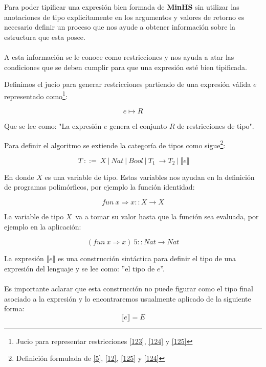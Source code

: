    Para poder tipificar una expresión bien formada de \textbf{MinHS}  sin utilizar las anotaciones de tipo explicitamente en los argumentos y valores de retorno es necesario definir un proceso que nos ayude a obtener información sobre la estructura que esta posee. \\\\
    A esta información se le conoce como restricciones y nos ayuda a atar las condiciones que se deben cumplir para que una expresión esté bien tipificada.

    \begin{definition}
        Definimos el jucio para generar restricciones partiendo de una expresión válida $e$ representado como\footnote{Jucio para representar restricciones \hyperlink{123}{[123]},  \hyperlink{124}{[124]} y \hyperlink{125}{[125]}}:
    
        $$e\mapsto R$$
        
        Que se lee como: "La expresión $e$ genera el conjunto $R$ de restricciones de tipo".
    \end{definition}


    \begin{definition}
        Para definir el algoritmo se extiende la categoría de tipos como sigue\footnote{Definición formulada de \hyperlink{5}{[5]},  \hyperlink{12}{[12]}, \hyperlink{125}{[125]} y \hyperlink{124}{[124]}}:
        
        $$\ T\ ::=\ X\ |\ Nat\ |\ Bool\ |\ T_1\ \to T_2\ |\ \llbracket e \rrbracket$$
        
        En donde $X$ es una variable de tipo. Estas variables nos ayudan en la definición de programas polimórficos, por ejemplo la función identidad:
        
        $$fun\ x\Rightarrow x :: X \to X$$ 
        
        La variable de tipo $X$$\,$ va a tomar su valor hasta que la función sea evaluada, por ejemplo en la aplicación:
       
        $$(fun \ x \Rightarrow x)\ 5 :: Nat \to Nat$$

        La expresión $\llbracket e \rrbracket$ es una construcción sintáctica para definir el tipo de una expresión del lenguaje y se lee como: ''el tipo de $e$''.\\\\
        Es importante aclarar que esta construcción no puede figurar como el tipo final asociado a la expresión y lo encontraremos usualmente aplicado de la siguiente forma: $$\llbracket e \rrbracket = E $$
            
    \end{definition}

